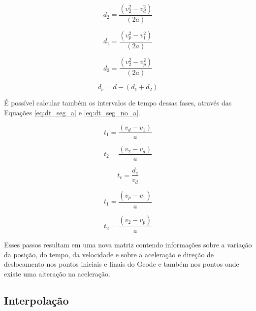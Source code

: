 \begin{equation}
    \label{eq:des_seg_a}
    d_2 = \frac{(v_2^2-v_d^2)}{(2 a)}
\end{equation}

\begin{equation}
    \label{eq:des_seg_a}
    d_1 = \frac{(v_p^2-v_1^2)}{(2 a)}
\end{equation}

\begin{equation}
    \label{eq:des_seg_a}
    d_2 = \frac{(v_2^2-v_p^2)}{(2 a)}
\end{equation}

\begin{equation}
    \label{eq:des_seg_no_a}
    d_c = d-(d_1+d_2)
\end{equation}

É possível calcular também os intervalos de tempo dessas fases, através das Equações \ref{eq:dt_seg_a} e \ref{eq:dt_seg_no_a}.

\begin{equation}
    \label{eq:dt_seg_a}
    t_1 = \frac{(v_d-v_1)}{a}
\end{equation}

\begin{equation}
    \label{eq:dt_seg_a}
    t_2 = \frac{(v_2-v_d)}{a}
\end{equation}

\begin{equation}
    \label{eq:dt_seg_no_a}
    t_c = \frac{d_c}{v_d}
\end{equation}

\begin{equation}
    \label{eq:dt_seg_a}
    t_1 = \frac{(v_p-v_1)}{a}
\end{equation}

\begin{equation}
    \label{eq:dt_seg_a}
    t_2 = \frac{(v_2-v_p)}{a}
\end{equation}


Esses passos resultam em uma nova matriz contendo informações sobre a variação da posição, do tempo, da velocidade e sobre a aceleração e direção de deslocamento nos pontos iniciais e finais do Gcode e também nos pontos onde existe uma alteração na aceleração.

\subsection{Interpolação}

